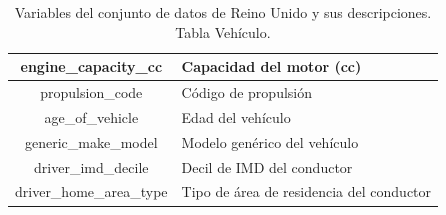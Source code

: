 \documentclass{uathesis-es}
\begin{document}
{\begin{table}[H]
\begin{center}
\begin{tabular}{|c|l|}
					engine\_capacity\_cc & Capacidad del motor (cc) \\ \hline
					propulsion\_code & Código de propulsión \\ \hline
					age\_of\_vehicle & Edad del vehículo \\ \hline
					generic\_make\_model & Modelo genérico del vehículo \\ \hline
					driver\_imd\_decile & Decil de IMD del conductor \\ \hline
					driver\_home\_area\_type & Tipo de área de residencia del conductor \\ \hline
				\end{tabular}
			\end{center}
			\caption{Variables del conjunto de datos de Reino Unido y sus descripciones. Tabla Vehículo.}
			\label{UK_VEHICLE_TABLE}
		\end{table}
		
}
\end{document}
